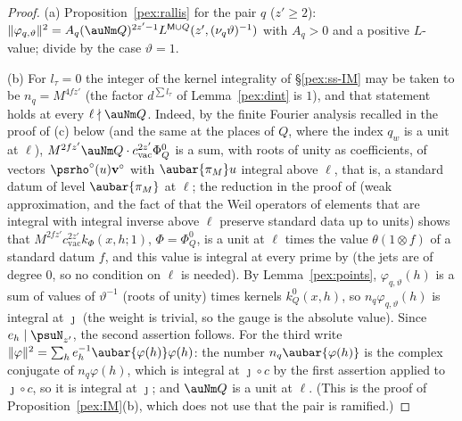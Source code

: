 \documentclass[10pt]{amsart}
\theoremstyle{definition}
\theoremstyle{remark}
\providecommand{\psvac}{\mathbf v}
\begin{document}
\begin{proof}
(a) Proposition~\ref{pex:rallis} for the pair $q$ ($z'\ge2$): $\|\varphi_{q,\vartheta}\|^2=A_q(\auNm
Q)^{2z'-1}L^{\mathsf M\cup Q}(z',(\nu_q\vartheta)^{-1})$ with $A_q>0$ and a positive $L$-value; divide
by the case $\vartheta=1$.

(b) For $l_\tau=0$ the integer of the kernel integrality of \S\ref{pex:ss-IM} may be taken to be
$n_q=M^{4fz'}$ (the factor $d^{\sum l_\tau}$ of Lemma~\ref{pex:dint} is $1$), and that statement holds at
every $\ell\nmid\auNm Q$. Indeed, by the finite Fourier analysis recalled in the proof of (c) below (and
the same at the places of $Q$, where the index $q_w$ is a unit at $\ell$), $M^{2fz'}\auNm Q\cdot
c_{\mathrm{vac}}^{2z'}\Phi^0_Q$ is a sum, with roots of unity as coefficients, of vectors
$\psrho^\circ(u)\psvac^\circ$ with $\aubar{\pi_M}u$ integral above $\ell$, that is, a standard datum of
level $\aubar{\pi_M}$ at $\ell$; the reduction in the proof of {\cite[Proposition~5.30]{P49}} (weak
approximation, and the fact of {\cite[\S7.4]{P49}} that the Weil operators of elements that are
integral with integral inverse above $\ell$ preserve standard data up to units) shows that
$M^{2fz'}c_{\mathrm{vac}}^{2z'}k_\Phi(x,h;1)$, $\Phi=\Phi^0_Q$, is a unit at $\ell$ times the value
$\theta(1\otimes f)$ of a standard datum $f$, and this value is integral at every prime by
{\cite[Lemma~7.14(a)]{P49}} (the jets are of degree $0$, so no condition on $\ell$ is needed). By
Lemma~\ref{pex:points}, $\varphi_{q,\vartheta}(h)$ is a sum of values of $\vartheta^{-1}$
(roots of unity) times kernels $k^0_Q(x,h)$, so $n_q\varphi_{q,\vartheta}(h)$ is integral at $\jmath$
(the weight is trivial, so the gauge is the absolute value). Since $e_h\mid\psuN_{z'}$, the second
assertion follows. For the third write $\|\varphi\|^2=\sum_he_h^{-1}\aubar{\varphi(h)}\varphi(h)$: the
number $n_q\aubar{\varphi(h)}$ is the complex conjugate of $n_q\varphi(h)$, which is integral at
$\jmath\circ c$ by the first assertion applied to $\jmath\circ c$, so it is integral at $\jmath$; and
$\auNm Q$ is a unit at $\ell$. (This is the proof of Proposition~\ref{pex:IM}(b), which does not use
that the pair is ramified.)


\end{proof}
\end{document}
